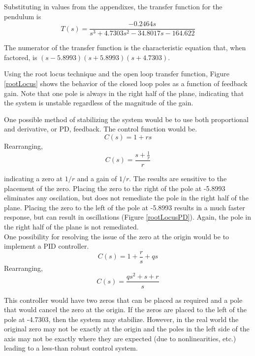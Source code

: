 \documentclass[12pt,letterpaper]{article}
\begin{document}
Substituting in values from the appendixes, the transfer function for the pendulum is
\begin{equation}
	T(s) =\frac{-0.2464 s}{s^3 + 4.7303 s^2 -34.8017 s -164.622}
\end{equation}

The numerator of the transfer function is the characteristic equation that, when factored, is
$(s-5.8993) (s+5.8993) (s+4.7303)$.

Using the root locus technique and the open loop transfer function, Figure \ref{rootLocus} shows the
behavior of the closed loop poles as a function of feedback gain.  Note that one pole is always in the right
half of the plane, indicating that the system is unstable regardless of the magnitude of the gain.

One possible method of stabilizing the system would be to use both proportional and derivative, or PD, feedback.  The control function would be.
\begin{equation}
	C(s) = 1 + r s
\end{equation}
Rearranging,
\begin{equation}
	C(s) = \frac{s+\frac{1}{r}}{r}
\end{equation}

indicating a zero at $1/r$ and a gain of $1/r$.
The results are sensitive to the placement of the zero.  Placing the zero to the right of the pole at -5.8993 
eliminates any oscilation, but does not remediate the pole in the right half of the plane.  Placing the zero to the left of the pole at -5.8993 results in a much faster response, but can result in oscillations (Figure \ref{rootLocusPD}).  Again, the pole in the right half of the plane is not remediated. \\


One possibility for resolving the issue of the zero at the origin would be to implement a PID controller.
\begin{equation}
	C(s) = 1 + \frac{r}{s} + q s
\end{equation}
Rearranging,
\begin{equation}
	C(s) = \frac{qs^2+s+r}{s}
\end{equation}

This controller would have two zeros that can be placed as required and a pole that would cancel
the zero at the origin.  If the zeros are placed to the left of the pole at -4.7303, then the system may stabilize.
However, in the real world the original zero may not be exactly at the origin and the poles in the left side of the axis may not be exactly where they are expected (due to nonlinearities, etc.) 
leading to a less-than robust control system. \\
\end{document}

